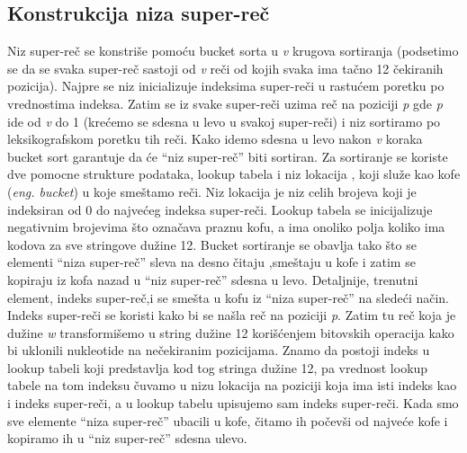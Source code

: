 \documentclass[a4paper]{article}
\begin{document}
{\subsection{Konstrukcija niza super-reč}
\label{subsec:knsr}
 Niz super-reč se konstriše pomoću bucket sorta u \textit{v} krugova sortiranja (podsetimo se da se svaka super-reč sastoji od \textit{v} reči od kojih svaka ima tačno 12 čekiranih pozicija). Najpre se niz inicializuje indeksima super-reči u rastućem poretku po vrednostima indeksa. Zatim se iz svake super-reči uzima reč na poziciji \textit{p} gde \textit{p} ide od \textit{v} do 1 (krećemo se sdesna u levo u svakoj super-reči) i niz sortiramo po leksikografskom poretku tih reči. Kako idemo sdesna u levo nakon \textit{v} koraka bucket sort garantuje da će ``niz super-reč'' biti sortiran. Za sortiranje se koriste dve pomocne strukture podataka, lookup tabela i niz lokacija , koji služe kao kofe (\textit{eng. bucket}) u koje smeštamo reči. Niz lokacija je niz celih brojeva koji je indeksiran od 0 do najvećeg indeksa super-reči. Lookup tabela se inicijalizuje negativnim brojevima što označava praznu kofu, a ima onoliko polja koliko ima kodova za sve stringove dužine 12. Bucket sortiranje se obavlja tako što se elementi ``niza super-reč'' sleva na desno  čitaju ,smeštaju u kofe i zatim se kopiraju iz kofa nazad u ``niz super-reč'' sdesna u levo. Detaljnije, trenutni element, indeks super-reč,i se smešta u kofu iz ``niza super-reč'' na sledeći način. Indeks super-reči se koristi kako bi se našla reč na poziciji \textit{p}. Zatim   tu reč koja je dužine \textit{w} transformišemo u string dužine 12 korišćenjem bitovskih operacija kako bi uklonili nukleotide na nečekiranim pozicijama. Znamo da postoji indeks u lookup tabeli koji predstavlja kod tog stringa dužine 12, pa vrednost lookup tabele na tom indeksu čuvamo u nizu lokacija na poziciji koja ima isti indeks kao i indeks super-reči, a u lookup tabelu upisujemo sam indeks super-reči. Kada smo sve elemente ``niza super-reč'' ubacili u kofe, čitamo ih počevši od najveće kofe i kopiramo ih u ``niz super-reč'' sdesna ulevo.
}
\end{document}
